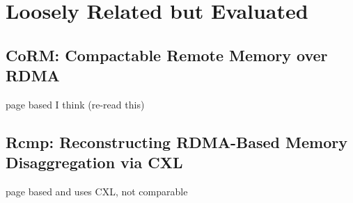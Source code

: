 \documentclass[sigplan,nonacm]{acmart}
\begin{document}
\section{Loosely Related but Evaluated}
    \subsection{CoRM: Compactable Remote Memory over RDMA}
    page based I think (re-read this)\cite{Taranov-ICMD-2021}

    \subsection{Rcmp: Reconstructing RDMA-Based Memory Disaggregation via CXL}
    page based and uses CXL, not comparable\cite{Wang-ACO-2024}




\end{document}
